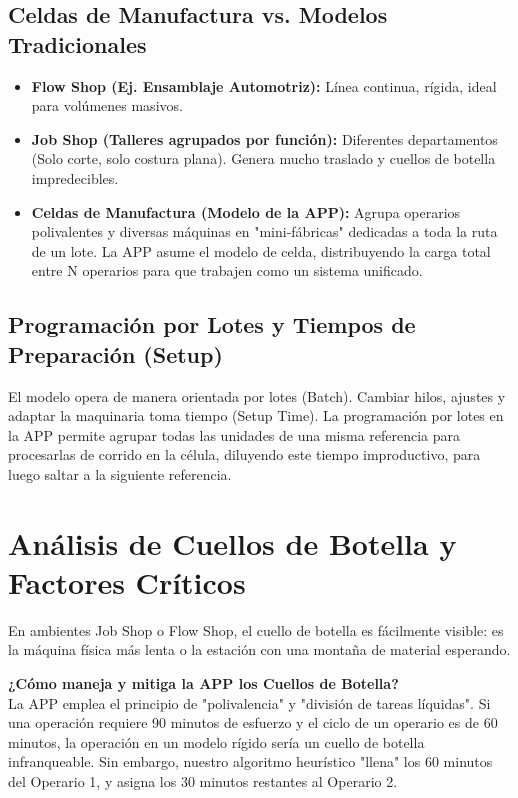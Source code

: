 \documentclass[12pt,a4paper]{article}
\begin{document}
\subsection{Celdas de Manufactura vs. Modelos Tradicionales}
\begin{itemize}
    \item \textbf{Flow Shop (Ej. Ensamblaje Automotriz):} Línea continua, rígida, ideal para volúmenes masivos.
    \item \textbf{Job Shop (Talleres agrupados por función):} Diferentes departamentos (Solo corte, solo costura plana). Genera mucho traslado y cuellos de botella impredecibles.
    \item \textbf{Celdas de Manufactura (Modelo de la APP):} Agrupa operarios polivalentes y diversas máquinas en "mini-fábricas" dedicadas a toda la ruta de un lote. La APP asume el modelo de celda, distribuyendo la carga total entre N operarios para que trabajen como un sistema unificado.
\end{itemize}

\subsection{Programación por Lotes y Tiempos de Preparación (Setup)}
El modelo opera de manera orientada por lotes (Batch). Cambiar hilos, ajustes y adaptar la maquinaria toma tiempo (Setup Time). La programación por lotes en la APP permite agrupar todas las unidades de una misma referencia para procesarlas de corrido en la célula, diluyendo este tiempo improductivo, para luego saltar a la siguiente referencia.

\section{Análisis de Cuellos de Botella y Factores Críticos}

En ambientes Job Shop o Flow Shop, el cuello de botella es fácilmente visible: es la máquina física más lenta o la estación con una montaña de material esperando.

\textbf{¿Cómo maneja y mitiga la APP los Cuellos de Botella?}\\
La APP emplea el principio de "polivalencia" y "división de tareas líquidas". Si una operación requiere 90 minutos de esfuerzo y el ciclo de un operario es de 60 minutos, la operación en un modelo rígido sería un cuello de botella infranqueable. Sin embargo, nuestro algoritmo heurístico "llena" los 60 minutos del Operario 1, y asigna los 30 minutos restantes al Operario 2.
\end{document}
